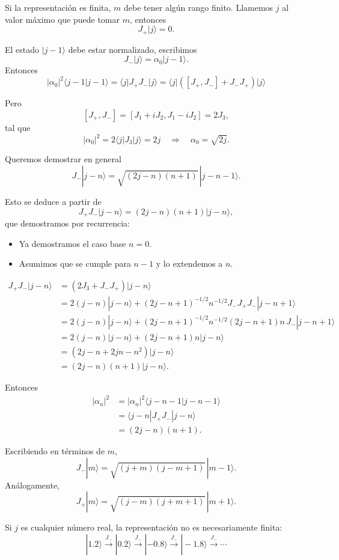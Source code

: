 \documentclass[11pt,a4paper]{article}
\begin{document}
Si la representación es finita, $m$ debe tener algún rango finito. Llamemos $j$ al valor máximo que puede tomar $m$, entonces
\[
  J_+|j\rangle=0.
\]

El estado $|j-1\rangle$ debe estar normalizado, escribimos
\[
  J_-|j\rangle=\alpha_0|j-1\rangle.
\]
Entonces
\[
  |\alpha_0|^2\langle j-1|j-1\rangle
  =\langle j|J_+J_-|j\rangle
  =\langle j|([J_+,J_-]+J_-J_+)|j\rangle
\]

Pero
\[
  [J_+,J_-]=[J_1+iJ_2,J_1-iJ_2]=2J_3,
\]
tal que
\[
  |\alpha_0|^2=2\langle j|J_3|j\rangle=2j
  \quad\Longrightarrow\quad
  \alpha_0=\sqrt{2j}.
\]

Queremos demostrar en general
\[
  J_-|j-n\rangle
  =\sqrt{(2j-n)(n+1)}\,|j-n-1\rangle.
\]

Esto se deduce a partir de
\[
  J_+J_-|j-n\rangle=(2j-n)(n+1)|j-n\rangle,
\]
que demostramos por recurrencia:

\begin{itemize}
  \item Ya demostramos el caso base $n=0$.
  \item Asumimos que se cumple para $n-1$ y lo extendemos a $n$.
\end{itemize}

\begin{align*}
  J_+J_-|j-n\rangle
  &=(2J_3+J_-J_+)|j-n\rangle \\
  &=2(j-n)|j-n\rangle
    +(2j-n+1)^{-1/2}n^{-1/2}
      J_-J_+J_-|j-n+1\rangle \\
  &=2(j-n)|j-n\rangle
    +(2j-n+1)^{-1/2}n^{-1/2}
      (2j-n+1)n\,J_-|j-n+1\rangle \\
  &=2(j-n)|j-n\rangle+(2j-n+1)n|j-n\rangle \\
  &=(2j-n+2jn-n^2)|j-n\rangle \\
  &=(2j-n)(n+1)|j-n\rangle.
\end{align*}

Entonces
\begin{align*}
  |\alpha_n|^2
  &=|\alpha_n|^2\langle j-n-1|j-n-1\rangle \\
  &=\langle j-n|J_+J_-|j-n\rangle \\
  &=(2j-n)(n+1).
\end{align*}

Escribiendo en términos de $m$,
\[
  J_-|m\rangle
  =\sqrt{(j+m)(j-m+1)}\,|m-1\rangle.
\]
Análogamente,
\[
  J_+|m\rangle
  =\sqrt{(j-m)(j+m+1)}\,|m+1\rangle.
\]

Si $j$ es cualquier número real, la representación no es necesariamente finita:
\[
  |1.2\rangle\xrightarrow{J_-}|0.2\rangle
  \xrightarrow{J_-}|-0.8\rangle
  \xrightarrow{J_-}|-1.8\rangle
  \xrightarrow{J_-}\cdots
\]
\end{document}
